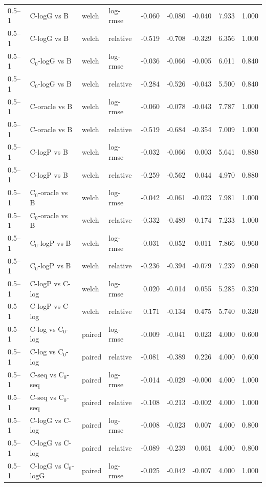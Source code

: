 \begin{longtable}{llllrrrrr}
0.5–1 & C-logG vs B & welch & log-rmse & -0.060 & -0.080 & -0.040 & 7.933 & 1.000 \\
0.5–1 & C-logG vs B & welch & relative & -0.519 & -0.708 & -0.329 & 6.356 & 1.000 \\
0.5–1 & C$_0$-logG vs B & welch & log-rmse & -0.036 & -0.066 & -0.005 & 6.011 & 0.840 \\
0.5–1 & C$_0$-logG vs B & welch & relative & -0.284 & -0.526 & -0.043 & 5.500 & 0.840 \\
0.5–1 & C-oracle vs B & welch & log-rmse & -0.060 & -0.078 & -0.043 & 7.787 & 1.000 \\
0.5–1 & C-oracle vs B & welch & relative & -0.519 & -0.684 & -0.354 & 7.009 & 1.000 \\
0.5–1 & C-logP vs B & welch & log-rmse & -0.032 & -0.066 & 0.003 & 5.641 & 0.880 \\
0.5–1 & C-logP vs B & welch & relative & -0.259 & -0.562 & 0.044 & 4.970 & 0.880 \\
0.5–1 & C$_0$-oracle vs B & welch & log-rmse & -0.042 & -0.061 & -0.023 & 7.981 & 1.000 \\
0.5–1 & C$_0$-oracle vs B & welch & relative & -0.332 & -0.489 & -0.174 & 7.233 & 1.000 \\
0.5–1 & C$_0$-logP vs B & welch & log-rmse & -0.031 & -0.052 & -0.011 & 7.866 & 0.960 \\
0.5–1 & C$_0$-logP vs B & welch & relative & -0.236 & -0.394 & -0.079 & 7.239 & 0.960 \\
0.5–1 & C-logP vs C-log & welch & log-rmse & 0.020 & -0.014 & 0.055 & 5.285 & 0.320 \\
0.5–1 & C-logP vs C-log & welch & relative & 0.171 & -0.134 & 0.475 & 5.740 & 0.320 \\
0.5–1 & C-log vs C$_0$-log & paired & log-rmse & -0.009 & -0.041 & 0.023 & 4.000 & 0.600 \\
0.5–1 & C-log vs C$_0$-log & paired & relative & -0.081 & -0.389 & 0.226 & 4.000 & 0.600 \\
0.5–1 & C-seq vs C$_0$-seq & paired & log-rmse & -0.014 & -0.029 & -0.000 & 4.000 & 1.000 \\
0.5–1 & C-seq vs C$_0$-seq & paired & relative & -0.108 & -0.213 & -0.002 & 4.000 & 1.000 \\
0.5–1 & C-logG vs C-log & paired & log-rmse & -0.008 & -0.023 & 0.007 & 4.000 & 0.800 \\
0.5–1 & C-logG vs C-log & paired & relative & -0.089 & -0.239 & 0.061 & 4.000 & 0.800 \\
0.5–1 & C-logG vs C$_0$-logG & paired & log-rmse & -0.025 & -0.042 & -0.007 & 4.000 & 1.000 \\

\end{longtable}
